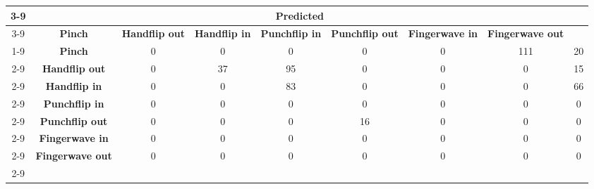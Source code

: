\documentclass{standalone}
\begin{document}
 
 \begin{tabular}{|c |c |c |c |c |c |c |c |c |}
\cline{3-9}\multicolumn{2}{c|}{} & \multicolumn{7}{c|}{\textbf{Predicted}} \\ 
\cline{3-9} \multicolumn{2}{c |}{ } & \textbf{Pinch} & \textbf{Handflip out} & \textbf{Handflip in} & \textbf{Punchflip in} & \textbf{Punchflip out} & \textbf{Fingerwave in} & \textbf{Fingerwave out}\\ 
\cline{1-9}\multirow{7}{*}{\rotatebox[origin=c]{90}{\textbf{Actual}}} & \textbf{Pinch} & 0 & 0 & 0 & 0 & 0 & 111 & 20\\ 
 \cline{2-9} & \textbf{Handflip out} & 0 & 37 & 95 & 0 & 0 & 0 & 15\\ 
 \cline{2-9} & \textbf{Handflip in} & 0 & 0 & 83 & 0 & 0 & 0 & 66\\ 
 \cline{2-9} & \textbf{Punchflip in} & 0 & 0 & 0 & 0 & 0 & 0 & 0\\ 
 \cline{2-9} & \textbf{Punchflip out} & 0 & 0 & 0 & 16 & 0 & 0 & 0\\ 
 \cline{2-9} & \textbf{Fingerwave in} & 0 & 0 & 0 & 0 & 0 & 0 & 0\\ 
 \cline{2-9} & \textbf{Fingerwave out} & 0 & 0 & 0 & 0 & 0 & 0 & 0\\ 
 \cline{2-9}\hline \end{tabular}
 
\end{document}
